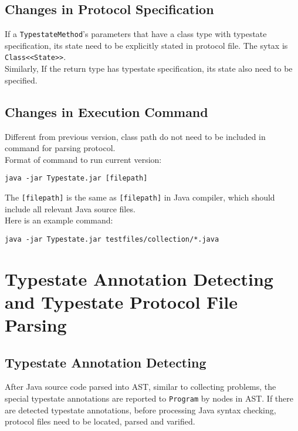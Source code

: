 \documentclass[]{article}
\begin{document}
\subsection{Changes in Protocol Specification}
If a \texttt{TypestateMethod}'s parameters that have a class type with typestate specification, its state need to be explicitly stated in protocol file. The sytax is \texttt{Class<<State>>}. \\[0.2cm]
Similarly, If the return type has typestate specification, its state also need to be specified.

\subsection{Changes in Execution Command}
Different from previous version, class path do not need to be included in command for parsing protocol. \\[0.2cm]
Format of command to run current version:
\begin{verbatim}
java -jar Typestate.jar [filepath]
\end{verbatim}
The \texttt{[filepath]} is the same as \texttt{[filepath]} in Java compiler, which should include all relevant Java source files.\\[0.2cm]
Here is an example command:
\begin{verbatim}
java -jar Typestate.jar testfiles/collection/*.java
\end{verbatim}


\section{Typestate Annotation Detecting and Typestate Protocol File Parsing}
\subsection{Typestate Annotation Detecting}
After Java source code parsed into AST, similar to collecting problems, the special typestate annotations are reported to \texttt{Program} by nodes in AST. If there are detected typestate annotations, before processing Java syntax checking, protocol files need to be located, parsed and varified.
\end{document}

